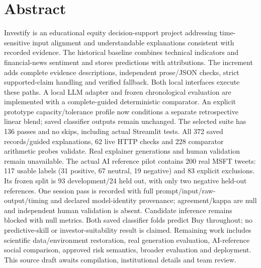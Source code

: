 \chapter*{Abstract}
Investify is an educational equity decision-support project addressing time-sensitive input alignment and understandable explanations consistent with recorded evidence. The historical baseline combines technical indicators and financial-news sentiment and stores predictions with attributions. The increment adds complete evidence descriptions, independent prose/JSON checks, strict supported-claim handling and verified fallback. Both local interfaces execute these paths. A local LLM adapter and frozen chronological evaluation are implemented with a complete-guided deterministic comparator. An explicit prototype capacity/tolerance profile now conditions a separate retrospective linear blend; saved classifier outputs remain unchanged. The selected suite has 136 passes and no skips, including actual Streamlit tests. All 372 saved records/guided explanations, 62 live HTTP checks and 228 comparator arithmetic probes validate. Real explainer generations and human validation remain unavailable. The actual AI reference pilot contains 200 real MSFT tweets: 117 usable labels (31 positive, 67 neutral, 19 negative) and 83 explicit exclusions. Its frozen split is 93 development/24 held out, with only two negative held-out references. One session pass is recorded with full prompt/input/raw-output/timing and declared model-identity provenance; agreement/kappa are null and independent human validation is absent. Candidate inference remains blocked with null metrics. Both saved classifier folds predict Buy throughout; no predictive-skill or investor-suitability result is claimed. Remaining work includes scientific data/environment restoration, real generation evaluation, AI-reference social comparison, approved risk semantics, broader evaluation and deployment. This source draft awaits compilation, institutional details and team review.
